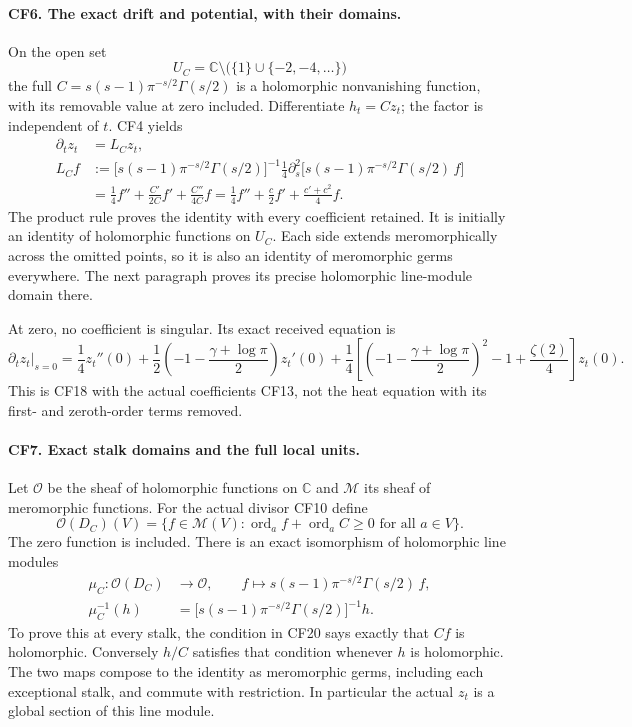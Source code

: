 \paragraph{CF6. The exact drift and potential, with their domains.}
On the open set
\[
 U_C=\mathbb C\setminus\bigl(\{1\}\cup\{-2,-4,\ldots\}\bigr)
\]
the full \(C=s(s-1)\pi^{-s/2}\Gamma(s/2)\) is a
holomorphic nonvanishing function, with its removable
value at zero included. Differentiate \(h_t=Cz_t\);
the factor is independent of \(t\). CF4 yields
\[
 \begin{split}
 \partial_t z_t
 &=L_Cz_t,\\
 L_C f
 &:=
 \bigl[s(s-1)\pi^{-s/2}\Gamma(s/2)\bigr]^{-1}
 \frac14\partial_s^2
 \bigl[s(s-1)\pi^{-s/2}\Gamma(s/2)\,f\bigr]\\
 &=\frac14 f''+\frac{C'}{2C}f'
                          +\frac{C''}{4C}f
  =\frac14f''+\frac c2f'+\frac{c'+c^2}{4}f .
 \end{split}\tag{CF18}
\]
The product rule proves the identity with every coefficient
retained. It is initially an identity of holomorphic
functions on \(U_C\). Each side extends meromorphically
across the omitted points, so it is also an identity of
meromorphic germs everywhere. The next paragraph proves
its precise holomorphic line-module domain there.

At zero, no coefficient is singular. Its exact received
equation is
\[
 \left.\partial_tz_t\right|_{s=0}
 =\frac14z_t''(0)
 +\frac12\left(-1-\frac{\gamma+\log\pi}{2}\right)z_t'(0)
 +\frac14\left[
   \left(-1-\frac{\gamma+\log\pi}{2}\right)^2
       -1+\frac{\zeta(2)}4\right]z_t(0).
 \tag{CF19}
\]
This is CF18 with the actual coefficients CF13, not
the heat equation with its first- and zeroth-order terms
removed.

\paragraph{CF7. Exact stalk domains and the full local units.}
Let \(\mathcal O\) be the sheaf of holomorphic functions on
\(\mathbb C\) and \(\mathcal M\) its sheaf of meromorphic
functions. For the actual divisor CF10 define
\[
 \mathcal O(D_C)(V)=
 \{f\in\mathcal M(V):\operatorname{ord}_a f+
             \operatorname{ord}_a C\ge0\text{ for all }a\in V\}.
 \tag{CF20}
\]
The zero function is included. There is an exact isomorphism
of holomorphic line modules
\[
 \begin{split}
 \mu_C:\mathcal O(D_C)&\longrightarrow\mathcal O,\qquad
 f\longmapsto s(s-1)\pi^{-s/2}\Gamma(s/2)\,f,\\
 \mu_C^{-1}(h)&=
       \bigl[s(s-1)\pi^{-s/2}\Gamma(s/2)\bigr]^{-1}h.
 \end{split}\tag{CF21}
\]
To prove this at every stalk, the condition in CF20 says
exactly that \(Cf\) is holomorphic. Conversely \(h/C\)
satisfies that condition whenever \(h\) is holomorphic.
The two maps compose to the identity as meromorphic
germs, including each exceptional stalk, and commute
with restriction. In particular the actual \(z_t\)
is a global section of this line module.

